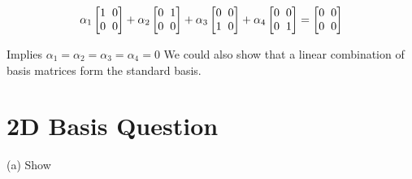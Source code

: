 \documentclass[11pt]{article}
\begin{document}
\begin{center}
\[ \alpha_1
\begin{bmatrix}
   1  \hspace{2mm}    0  \\
    0   \hspace{2mm}  0 
            
\end{bmatrix}
+
\alpha_2
\begin{bmatrix}
   0  \hspace{2mm}    1  \\
    0   \hspace{2mm}  0 
            
\end{bmatrix}
+
\alpha_3
\begin{bmatrix}
   0 \hspace{2mm}    0  \\
    1   \hspace{2mm}  0 
            
\end{bmatrix}
+ 
\alpha_4
\begin{bmatrix}
   0  \hspace{2mm}    0  \\
    0   \hspace{2mm}  1 
            
\end{bmatrix}
=
\begin{bmatrix}
   0  \hspace{2mm}    0  \\
    0   \hspace{2mm}  0 
            
\end{bmatrix}
\]
\end{center}

Implies $\alpha_1 = \alpha_2 = \alpha_3 = \alpha_4 = 0$\newline
We could also show that a linear combination of basis matrices form the standard basis.

\vspace{4mm}

\section{2D Basis Question}

(a) Show
\end{document}
